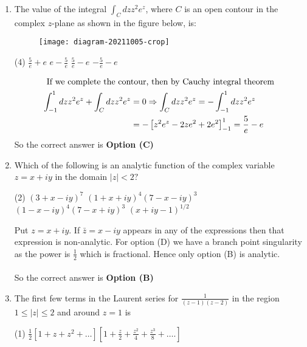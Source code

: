 \begin{enumerate}[label=\color{ocre}\textbf{\arabic*.}]
	\item The value of the integral $\int_{C} d z z^{2} e^{z}$, where $C$ is an open contour in the complex $z$-plane as shown in the figure below, is:
	{}
	\begin{figure}[H]
		\centering
		\texttt{[image: diagram-20211005-crop]}
	\end{figure}
	\begin{tasks}(4)
		\task[\textbf{A.}] $\frac{5}{e}+e$
		\task[\textbf{B.}] $e-\frac{5}{e}$
		\task[\textbf{C.}] $\frac{5}{e}-e$
		\task[\textbf{D.}] $-\frac{5}{e}-e$
	\end{tasks}
	\begin{answer}
		\begin{align*}
		\intertext { If we complete the contour, then by Cauchy integral theorem }
		\int_{-1}^{1} d z z^{2} e^{z}+\int_{C} d z z^{2} e^{z}&=0 \Rightarrow \int_{C} d z z^{2} e^{z}=-\int_{-1}^{1} d z z^{2} e^{z}\\&=-\left[z^{2} e^{z}-2 z e^{2}+2 e^{2}\right]_{-1}^{1}=\frac{5}{e}-e
		\end{align*}
		So the correct answer is \textbf{Option (C)}
	\end{answer}
	\item Which of the following is an analytic function of the complex variable $z=x+i y$ in the domain $|z|<2 ?$
	{}
	\begin{tasks}(2)
		\task[\textbf{A.}] $(3+x-i y)^{7}$
		\task[\textbf{B.}] $(1+x+i y)^{4}(7-x-i y)^{3}$
		\task[\textbf{C.}] $(1-x-i y)^{4}(7-x+i y)^{3}$
		\task[\textbf{D.}] $(x+i y-1)^{1 / 2}$
	\end{tasks}
	\begin{answer}
		Put $z=x+i y .$ If $\bar{z}=x-i y$ appears in any of the expressions then that expression is non-analytic. For option (D) we have a branch point singularity as the power is $\frac{1}{2}$ which is fractional. Hence only option (B) is analytic.\\\\
		So the correct answer is \textbf{Option (B)}
	\end{answer}
	\item The first few terms in the Laurent series for $\frac{1}{(z-1)(z-2)}$ in the region $1 \leq|z| \leq 2$ and around $z=1$ is
	{}
	\begin{tasks}(1)
		\task[\textbf{A.}] $\frac{1}{2}\left[1+z+z^{2}+\ldots\right]\left[1+\frac{z}{2}+\frac{z^{2}}{4}+\frac{z^{3}}{8}+\ldots .\right]$

\end{tasks}
\end{enumerate}
